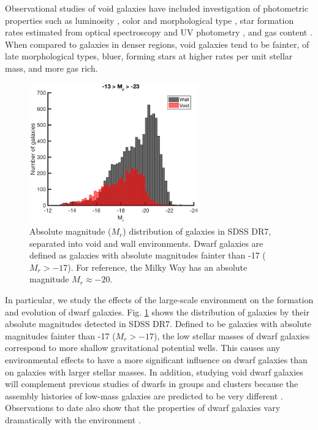 Observational studies of void galaxies have included investigation of 
photometric properties such as luminosity \citep{Hoyle05,Croton05,Moorman15}, 
color and morphological type \citep{Grogin00,Rojas04,Patiri06,Park07,
vonBendaBeckmann08,Hoyle12}, star formation rates estimated from optical 
spectroscopy and UV photometry \citep{Rojas05,Moorman15,Beygu16}, and gas 
content \citep{Kreckel12,Moorman16,Jones16}.  When compared to galaxies in 
denser regions, void galaxies tend to be fainter, of late morphological types, 
bluer, forming stars at higher rates per unit stellar mass, and more gas rich.

\begin{figure}
    \includegraphics[width=0.65\textwidth]{Images/Intro/1sig_13-23_SDSS_Mr_hist_count_fill}
    \caption[Absolute magnitude distribution of galaxies in SDSS DR7]{Absolute 
    magnitude ($M_r$) distribution of galaxies in SDSS DR7, separated into void 
    and wall environments.  Dwarf galaxies are defined as galaxies with absolute 
    magnitudes fainter than -17 ($M_r > -17$).  For reference, the Milky Way has 
    an absolute magnitude $M_r \approx -20$.}
    \label{fig:Mr_SDSS}
\end{figure}

In particular, we study the effects of the large-scale environment on the 
formation and evolution of dwarf galaxies.  Fig. \ref{fig:Mr_SDSS} shows the 
distribution of galaxies by their absolute magnitudes detected in SDSS DR7.  
Defined to be galaxies with absolute magnitudes fainter than -17 ($M_r > -17$), 
the low stellar masses of dwarf galaxies correspond to more shallow 
gravitational potential wells.  This causes any environmental effects to have a 
more significant influence on dwarf galaxies than on galaxies with larger 
stellar masses.  In addition, studying void dwarf galaxies will complement 
previous studies of dwarfs in groups and clusters because the assembly histories 
of low-mass galaxies are predicted to be very different \citep[e.g.,][]{Gao07,
Lackner12}.  Observations to date also show that the properties of dwarf 
galaxies vary dramatically with the environment \citep[e.g.,][]{Ann08,Geha12}.



